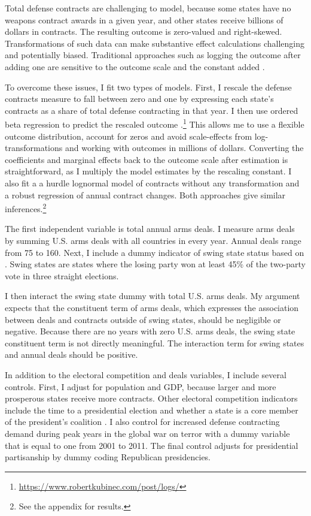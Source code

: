 \documentclass[12pt]{article}
\begin{document}
Total defense contracts are challenging to model, because some states have no weapons contract awards in a given year, and other states receive billions of dollars in contracts. 
The resulting outcome is zero-valued and right-skewed. 
Transformations of such data can make substantive effect calculations challenging and potentially biased. 
Traditional approaches such as logging the outcome after adding one are sensitive to the outcome scale and the constant added \citep{ChenRoth2022, MullahyNorton2022}. 


To overcome these issues, I fit two types of models.
First, I rescale the defense contracts measure to fall between zero and one by expressing each state's contracts as a share of total defense contracting in that year.
I then use ordered beta regression to predict the rescaled outcome \citep{Kubinec2022}.\footnote{\url{https://www.robertkubinec.com/post/logs/}} 
This allows me to use a flexible outcome distribution, account for zeros and avoid scale-effects from log-transformations and working with outcomes in millions of dollars. 
Converting the coefficients and marginal effects back to the outcome scale after estimation is straightforward, as I multiply the model estimates by the rescaling constant.
I also fit a a hurdle lognormal model of contracts without any transformation and a robust regression of annual contract changes. 
Both approaches give similar inferences.\footnote{See the appendix for results.} 


The first independent variable is total annual arms deals.  
I measure arms deals by summing U.S. arms deals with all countries in every year. 
Annual deals range from 75 to 160. 
Next, I include a dummy indicator of swing state status based on \citet{KrinerReeves2015}.
Swing states are states where the losing party won at least 45\% of the two-party vote in three straight elections. 


I then interact the swing state dummy with total U.S. arms deals. 
My argument expects that the constituent term of arms deals, which expresses the association between deals and contracts outside of swing states, should be negligible or negative.
Because there are no years with zero U.S. arms deals, the swing state constituent term is not directly meaningful.  
The interaction term for swing states and annual deals should be positive.


In addition to the electoral competition and deals variables, I include several controls. 
First, I adjust for population and GDP, because larger and more prosperous states receive more contracts. 
Other electoral competition indicators include the time to a presidential election and whether a state is a core member of the president's coalition \citep{KrinerReeves2015}. 
I also control for increased defense contracting demand during peak years in the global war on terror with a dummy variable that is equal to one from 2001 to 2011. 
The final control adjusts for presidential partisanship by dummy coding Republican presidencies. 
\end{document}
